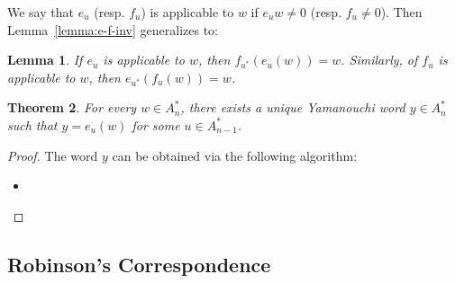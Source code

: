 \documentclass[12pt]{amsart}
\newtheorem{theorem}{Theorem}[subsection]
\newtheorem{lemma}[theorem]{Lemma}
\theoremstyle{definition}
\theoremstyle{example}
\begin{document}
We say that $e_u$ (resp. $f_u$) is applicable to $w$ if $e_uw\neq 0$ (resp. $f_u\neq 0$).
Then Lemma~\ref{lemma:e-f-inv} generalizes to:
\begin{lemma}
  If $e_u$ is applicable to $w$, then $f_{u^*}(e_u(w))=w$.
  Similarly, of $f_u$ is applicable to $w$, then $e_{u^*}(f_u(w))=w$.
\end{lemma}

\begin{theorem}
  For every $w\in A_n^*$, there exists a unique Yamanouchi word $y\in A_n^*$ such that $y=e_u(w)$ for some $u\in A_{n-1}^*$.
\end{theorem}
\begin{proof}
  The word $y$ can be obtained via the following algorithm:
  \begin{itemize}
  \item 
  \end{itemize}
\end{proof}
\subsection{Robinson's Correspondence}
\label{sec:robins-corr}
\end{document}
